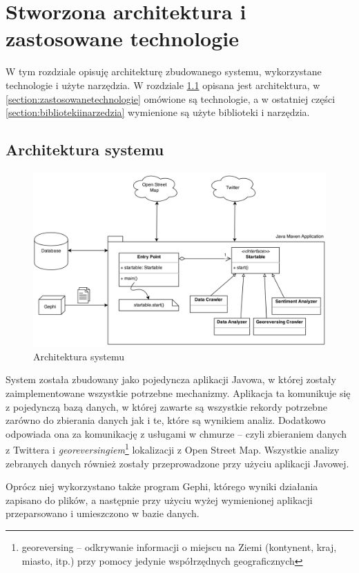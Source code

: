 \chapter{Stworzona architektura i zastosowane technologie}
\label{chapter:architektura}
W tym rozdziale opisuję architekturę zbudowanego systemu, wykorzystane
technologie i użyte narzędzia.
W rozdziale \ref{section:architekturasystemu} opisana jest architektura, w
\ref{section:zastosowanetechnologie} omówione są technologie, a w ostatniej
części \ref{section:bibliotekiinarzedzia} wymienione są użyte biblioteki i
narzędzia.
\section{Architektura systemu}
\label{section:architekturasystemu}

\begin{figure}[ht!]
\centering
\includegraphics[width=150mm]{img/architektura.png}
\caption{Architektura systemu}
\label{image:architektura-systemu}
\end{figure}
System została zbudowany jako pojedyncza aplikacji Javowa,
w której zostały zaimplementowane wszystkie potrzebne mechanizmy.
Aplikacja ta komunikuje się z pojedynczą bazą danych, w której zawarte
są wszystkie rekordy potrzebne zarówno do zbierania danych jak i te, które są
wynikiem analiz. Dodatkowo odpowiada ona za komunikację z usługami w chmurze --
czyli zbieraniem danych z Twittera i \textit{georeversingiem}\footnote{georeversing
 -- odkrywanie informacji o miejscu na Ziemi
(kontynent, kraj, miasto, itp.) przy pomocy jedynie współrzędnych
geograficznych} lokalizacji z Open Street Map. Wszystkie analizy zebranych
danych również zostały przeprowadzone przy użyciu aplikacji Javowej.

Oprócz niej wykorzystano także program Gephi, którego wyniki działania zapisano
do plików, a następnie przy użyciu wyżej wymienionej aplikacji przeparsowano i
umieszczono w bazie danych.

